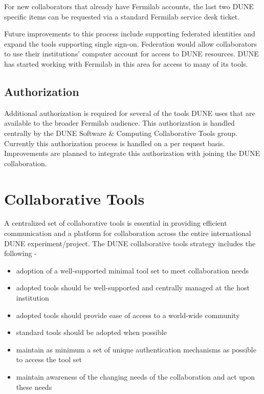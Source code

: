 For new collaborators that already have Fermilab accounts, the last two DUNE specific items can be requested via a standard Fermilab service desk ticket.

Future improvements to this process include supporting federated identities and expand the tools supporting single sign-on.  Federation would allow collaborators to use their institutions' computer account for access to DUNE resources. DUNE has started working with Fermilab in this area for access to many of its tools.

\subsection{Authorization}
Additional authorization is required for several of the tools DUNE uses that are available to the broader Fermilab audience.  This authorization is handled centrally by the DUNE Software \& Computing Collaborative Tools group. Currently this authorization process is handled on a per request basis. Improvements are planned to integrate this authorization with joining the DUNE collaboration.

\section{Collaborative Tools}
A centralized set of collaborative tools is essential in providing efficient communication and a platform for collaboration across the entire international DUNE experiment/project.  The DUNE collaborative tools strategy includes the following -
\begin{itemize}
\item adoption of a well-supported minimal tool set to meet collaboration needs
\item adopted tools should be well-supported and centrally managed at the host institution
\item adopted tools should provide ease of access to a world-wide community
\item standard tools should be adopted when possible
\item maintain as minimum a set of unique authentication mechanisms as possible to access the tool set
\item maintain awareness of the changing needs of the collaboration and act upon these needs
\end{itemize}

